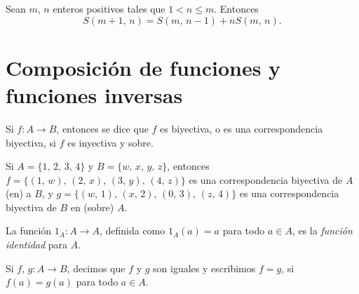 \begin{theorem}{}{}
    Sean $m$, $n$ enteros positivos tales que $1 < n \leq m$. Entonces
    $$S(m + 1, \, n) = S(m, \, n-1) + nS(m, \, n).$$
\end{theorem}

\section{Composición de funciones y funciones inversas}

\begin{definicion}{}{}
    Si $f: A \longrightarrow B$, entonces se dice que $f$ es biyectiva, o es una correspondencia biyectiva, si $f$ es inyectiva y sobre.
\end{definicion}

\newpage

\begin{myexample}
    Si $A = \{ 1, \, 2, \, 3, \, 4\}$ y $B = \{w, \, x, \, y, \, z\}$, entonces $f= \{(1, \, w), \, (2, \, x), \, (3, \, y), \, (4, \, z)\}$ es una correspondencia biyectiva de $A$ (en) a $B$, y $g = \{(w, \, 1), \, (x, \, 2), \, (0, \, 3), \, (z, \, 4)\}$ es una correspondencia biyectiva de $B$ en (sobre) $A$.
\end{myexample}

\begin{definicion}{}{}
    La función $1_A: A \longrightarrow A$, definida como $1_A (a) = a$ para todo $ a \in A$, es la \textit{función identidad} para $A$.
\end{definicion}

\begin{definicion}{}{}
    Si $f$, $g: A \longrightarrow B$, decimos que $f$ y $g$ son iguales y escribimos $f = g$, si $f(a) = g(a)$ para todo $a \in A$.
\end{definicion}

